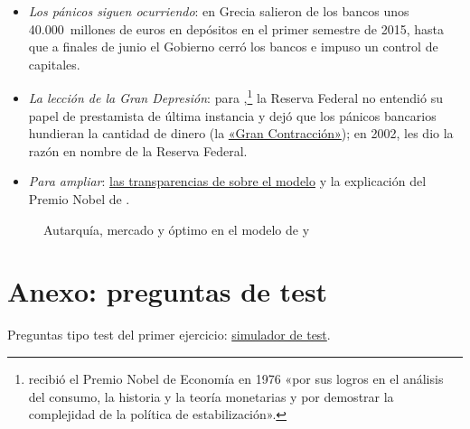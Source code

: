 \documentclass[11pt]{article}
\begin{document}
\begin{itemize}
\begin{itemize}
  \end{itemize}
\item \emph{Los pánicos siguen ocurriendo}: en Grecia salieron de los bancos unos 40.000~millones de euros en depósitos en el primer semestre de 2015, hasta que a finales de junio el Gobierno cerró los bancos e impuso un control de capitales\nocite{BCE2026BSIGrecia,BIS2017Stournaras}.
\item \emph{La lección de la Gran Depresión}: para \textcite{FriedmanSchwartz1963Monetary},\footnote{ recibió el Premio Nobel de Economía en 1976 «por sus logros en el análisis del consumo, la historia y la teoría monetarias y por demostrar la complejidad de la política de estabilización»\nocite{Nobel1976Friedman}.} la Reserva Federal no entendió su papel de prestamista de última instancia y dejó que los pánicos bancarios hundieran la cantidad de dinero (la \href{https://en.wikipedia.org/wiki/Great_Contraction}{«Gran Contracción»}); en 2002, \textcite{Bernanke2002Friedman} les dio la razón en nombre de la Reserva Federal.
\item \emph{Para ampliar}: \href{https://academicweb.nd.edu/~esims1/slides_diamond_sp2019.pdf}{las transparencias de  sobre el modelo}\nocite{Sims2019Diamond} y la explicación del Premio Nobel de \textcite{Repullo2022Nobel}.
\end{itemize}

\begin{figure}[H]
\centering
\caption{Autarquía, mercado y óptimo en el modelo de  y }\label{fig:diamond-dybvig}
\end{figure}

\section{Anexo: preguntas de test}\label{anexo:test}

\begin{anotaciones}
Preguntas tipo test del primer ejercicio: \href{https://www.victorgutierrezmarcos.es/oposicion/temario/primer-ejercicio/test/simulador.html?tema=3.B.17}{simulador de test}.
\end{anotaciones}

\bibliografia
\end{document}
